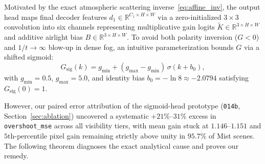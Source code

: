 \documentclass[journal,twoside]{IEEEtran}
\begin{document}
Motivated by the exact atmospheric scattering inverse~\eqref{eq:affine_inv}, the output head maps final decoder features $d_1\in\mathbb{R}^{C_1\times H\times W}$ via a zero-initialized $3\times 3$ convolution into six channels representing multiplicative gain logits $\tilde{K}\in\mathbb{R}^{3\times H\times W}$ and additive airlight bias $B\in\mathbb{R}^{3\times H\times W}$. To avoid both polarity inversion ($G<0$) and $1/t\to\infty$ blow-up in dense fog, an intuitive parameterization bounds $G$ via a shifted sigmoid:
\begin{equation}
G_{\mathrm{sig}}(k) = g_{\min} + (g_{\max} - g_{\min})\,\sigma(k + b_0),
\label{eq:basr_sig}
\end{equation}
with $g_{\min}=0.5$, $g_{\max}=5.0$, and identity bias $b_0 = -\ln 8 \approx -2.0794$ satisfying $G_{\mathrm{sig}}(0)=1$.

However, our paired error attribution of the sigmoid-head prototype (\texttt{014b}, Section~\ref{sec:ablation}) uncovered a systematic $+21\%\text{--}31\%$ excess in \texttt{overshoot\_mse} across all visibility tiers, with mean gain stuck at $1.146\text{--}1.151$ and $5\text{th}$-percentile pixel gain remaining strictly above unity in $95.7\%$ of Mist scenes. The following theorem diagnoses the exact analytical cause and proves our remedy.
\end{document}
